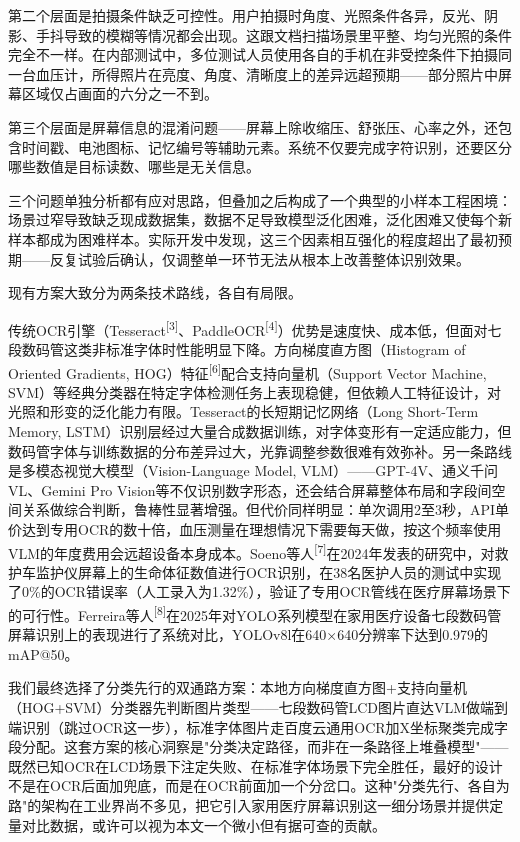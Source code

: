 \documentclass[zihao=-4,a4paper]{ctexart}
\begin{document}
第二个层面是拍摄条件缺乏可控性。用户拍摄时角度、光照条件各异，反光、阴影、手抖导致的模糊等情况都会出现。这跟文档扫描场景里平整、均匀光照的条件完全不一样。在内部测试中，多位测试人员使用各自的手机在非受控条件下拍摄同一台血压计，所得照片在亮度、角度、清晰度上的差异远超预期——部分照片中屏幕区域仅占画面的六分之一不到。

第三个层面是屏幕信息的混淆问题——屏幕上除收缩压、舒张压、心率之外，还包含时间戳、电池图标、记忆编号等辅助元素。系统不仅要完成字符识别，还要区分哪些数值是目标读数、哪些是无关信息。

三个问题单独分析都有应对思路，但叠加之后构成了一个典型的小样本工程困境：场景过窄导致缺乏现成数据集，数据不足导致模型泛化困难，泛化困难又使每个新样本都成为困难样本。实际开发中发现，这三个因素相互强化的程度超出了最初预期——反复试验后确认，仅调整单一环节无法从根本上改善整体识别效果。

现有方案大致分为两条技术路线，各自有局限。

传统OCR引擎（Tesseract\textsuperscript{[3]}、PaddleOCR\textsuperscript{[4]}）优势是速度快、成本低，但面对七段数码管这类非标准字体时性能明显下降。方向梯度直方图（Histogram of Oriented Gradients, HOG）特征\textsuperscript{[6]}配合支持向量机（Support Vector Machine, SVM）等经典分类器在特定字体检测任务上表现稳健，但依赖人工特征设计，对光照和形变的泛化能力有限。Tesseract的长短期记忆网络（Long Short-Term Memory, LSTM）识别层经过大量合成数据训练，对字体变形有一定适应能力，但数码管字体与训练数据的分布差异过大，光靠调整参数很难有效弥补。另一条路线是多模态视觉大模型（Vision-Language Model, VLM）——GPT-4V、通义千问VL、Gemini Pro Vision等不仅识别数字形态，还会结合屏幕整体布局和字段间空间关系做综合判断，鲁棒性显著增强。但代价同样明显：单次调用2至3秒，API单价达到专用OCR的数十倍，血压测量在理想情况下需要每天做，按这个频率使用VLM的年度费用会远超设备本身成本。Soeno等人\textsuperscript{[7]}在2024年发表的研究中，对救护车监护仪屏幕上的生命体征数值进行OCR识别，在38名医护人员的测试中实现了0\%的OCR错误率（人工录入为1.32\%），验证了专用OCR管线在医疗屏幕场景下的可行性。Ferreira等人\textsuperscript{[8]}在2025年对YOLO系列模型在家用医疗设备七段数码管屏幕识别上的表现进行了系统对比，YOLOv8l在640×640分辨率下达到0.979的mAP@50。

我们最终选择了分类先行的双通路方案：本地方向梯度直方图+支持向量机（HOG+SVM）分类器先判断图片类型——七段数码管LCD图片直达VLM做端到端识别（跳过OCR这一步），标准字体图片走百度云通用OCR加X坐标聚类完成字段分配。这套方案的核心洞察是"分类决定路径，而非在一条路径上堆叠模型"——既然已知OCR在LCD场景下注定失败、在标准字体场景下完全胜任，最好的设计不是在OCR后面加兜底，而是在OCR前面加一个分岔口。这种"分类先行、各自为路"的架构在工业界尚不多见，把它引入家用医疗屏幕识别这一细分场景并提供定量对比数据，或许可以视为本文一个微小但有据可查的贡献。
\end{document}
